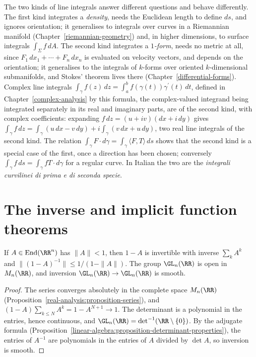 \begin{remark}\label{real-analysis:remark-two-kinds}
The two kinds of line integrals answer different questions and behave differently. The first kind integrates a \emph{density}, needs the Euclidean length to define $ds$, and ignores orientation; it
generalises to integrals over curves in a Riemannian manifold (Chapter~\ref{riemannian-geometry}) and, in higher dimensions, to surface integrals $\int_\Sigma f\,dA$. The second kind integrates a
\emph{$1$-form}, needs no metric at all, since $F_1\,dx_1 + \cdots + F_n\,dx_n$ is evaluated on velocity vectors, and depends on the orientation; it generalises to the integrals of $k$-forms over oriented
$k$-dimensional submanifolds, and Stokes' theorem lives there (Chapter~\ref{differential-forms}). Complex line integrals $\int_\gamma f(z)\,dz = \int_a^bf(\gamma(t))\gamma^{\prime}(t)\,dt$, defined in Chapter~\ref{complex-analysis} by this formula, the complex-valued integrand being integrated
separately in its real and imaginary parts, are of the second kind, with complex coefficients: expanding $f\,dz = (u + iv)(dx + i\,dy)$ gives
$\int_\gamma f\,dz = \int_\gamma(u\,dx - v\,dy) + i\int_\gamma(v\,dx + u\,dy)$, two real line integrals of the second kind. The relation $\int_\gamma F \cdot d\gamma = \int_\gamma\langle F, T\rangle\,ds$ shows that the second kind is a special case of the first, once a
direction has been chosen; conversely $\int_\gamma f\,ds = \int_\gamma fT \cdot d\gamma$ for a regular curve. In Italian the two are the \emph{integrali curvilinei di prima e di seconda specie}.
\end{remark}

\section{The inverse and implicit function theorems}\label{real-analysis:section-inverse-function}

\begin{lemma}\label{real-analysis:lemma-neumann}
If $A \in \operatorname{End}(\RR^n)$ has $\|A\| < 1$, then $1 - A$ is invertible with inverse $\sum_kA^k$ and $\|(1 - A)^{-1}\| \leq 1/(1 - \|A\|)$. The group $\GL_n(\RR)$ is open in $M_n(\RR)$, and
inversion $\GL_n(\RR) \to \GL_n(\RR)$ is smooth.
\end{lemma}

\begin{proof}
The series converges absolutely in the complete space $M_n(\RR)$ (Proposition~\ref{real-analysis:proposition-series}), and $(1 - A)\sum_{k \leq N}A^k = 1 - A^{N+1} \to 1$. The determinant is a polynomial in the
entries, hence continuous, and $\GL_n(\RR) = \det^{-1}(\RR \setminus \{0\})$. By the adjugate formula (Proposition~\ref{linear-algebra:proposition-determinant-properties}), the entries of $A^{-1}$ are
polynomials in the entries of $A$ divided by $\det A$, so inversion is smooth.
\end{proof}

